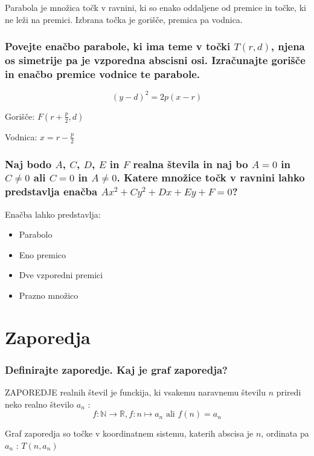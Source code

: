 \documentclass{article}
\begin{document}
Parabola je množica točk v ravnini, ki so enako oddaljene od premice in točke, ki ne leži na premici. Izbrana točka je gorišče, premica pa vodnica.

\subsubsection*{Povejte enačbo parabole, ki ima teme v točki $T(r, d)$, njena os simetrije pa je vzporedna abscisni osi. Izračunajte gorišče in enačbo premice vodnice te parabole.}

$$
(y-d)^2 = 2p(x-r)
$$

\vspace{5mm}

\centerline{Gorišče: $F(r + \frac{p}{2}, d)$} 
\vspace{2mm}
\centerline{Vodnica: $x = r - \frac{p}{2}$}

\subsubsection*{Naj bodo $A$, $C$, $D$, $E$ in $F$ realna števila in naj bo $A=0$ in $C \neq 0$ ali $C=0$ in $A \neq 0$. Katere množice točk v ravnini lahko predstavlja enačba $A x^{2}+C y^{2}+D x+E y+F=0$?}

Enačba lahko predstavlja:

\begin{itemize}
  \item Parabolo
  \item Eno premico
  \item Dve vzporedni premici
  \item Prazno množico
\end{itemize}

\section{Zaporedja}

\subsubsection*{Definirajte zaporedje. Kaj je graf zaporedja?}

ZAPOREDJE realnih števil je funckija, ki vsakemu naravnemu številu $n$ priredi neko realno število $a_{n}$ :
$$
f: \mathbb{N} \rightarrow \mathbb{R}, f: n \mapsto a_{n} \text{ ali } f(n)=a_{n}
$$

Graf zaporedja so točke v koordinatnem sistemu, katerih abscisa je $n$, ordinata pa $a_{n}$ : $T\left(n, a_{n}\right)$
\end{document}
